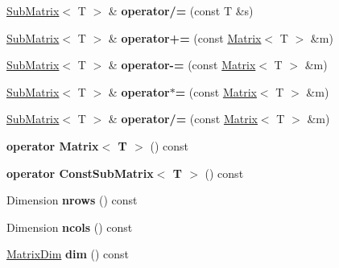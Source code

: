 \begin{DoxyCompactItemize}
\item 
\mbox{\label{classTLAS_1_1SubMatrix_a9a8cdcf68ce344ba9415459235700e52}} 
\hyperlink{classTLAS_1_1SubMatrix}{Sub\+Matrix}$<$ T $>$ \& {\bfseries operator/=} (const T \&s)
\item 
\mbox{\label{classTLAS_1_1SubMatrix_a5653e1cd25041b4841eef3852bdcd449}} 
\hyperlink{classTLAS_1_1SubMatrix}{Sub\+Matrix}$<$ T $>$ \& {\bfseries operator+=} (const \hyperlink{classTLAS_1_1Matrix}{Matrix}$<$ T $>$ \&m)
\item 
\mbox{\label{classTLAS_1_1SubMatrix_a4ee9bebad4c52e44c06620f0d4bda9af}} 
\hyperlink{classTLAS_1_1SubMatrix}{Sub\+Matrix}$<$ T $>$ \& {\bfseries operator-\/=} (const \hyperlink{classTLAS_1_1Matrix}{Matrix}$<$ T $>$ \&m)
\item 
\mbox{\label{classTLAS_1_1SubMatrix_a5ab3d0cde11e9a1c815f0dd5af11cde9}} 
\hyperlink{classTLAS_1_1SubMatrix}{Sub\+Matrix}$<$ T $>$ \& {\bfseries operator$\ast$=} (const \hyperlink{classTLAS_1_1Matrix}{Matrix}$<$ T $>$ \&m)
\item 
\mbox{\label{classTLAS_1_1SubMatrix_a3b1aeccdeedc71374a1342993448fd98}} 
\hyperlink{classTLAS_1_1SubMatrix}{Sub\+Matrix}$<$ T $>$ \& {\bfseries operator/=} (const \hyperlink{classTLAS_1_1Matrix}{Matrix}$<$ T $>$ \&m)
\item 
\mbox{\label{classTLAS_1_1SubMatrix_a7bca3c0f0e45d382cc0123c97433de5c}} 
{\bfseries operator Matrix$<$ T $>$} () const
\item 
\mbox{\label{classTLAS_1_1SubMatrix_a74fa3b75c0055427671d8dd568354b47}} 
{\bfseries operator Const\+Sub\+Matrix$<$ T $>$} () const
\item 
\mbox{\label{classTLAS_1_1SubMatrix_ab84f5f519e0a503f3c327c2cb3f581e8}} 
Dimension {\bfseries nrows} () const
\item 
\mbox{\label{classTLAS_1_1SubMatrix_af548b637911cf3ef0ce4fb4cba5e5d37}} 
Dimension {\bfseries ncols} () const
\item 
\mbox{\label{classTLAS_1_1SubMatrix_a95dc03222bd47c6509697735cff3b7fd}} 
\hyperlink{structTLAS_1_1MatrixDim}{Matrix\+Dim} {\bfseries dim} () const
\end{DoxyCompactItemize}
